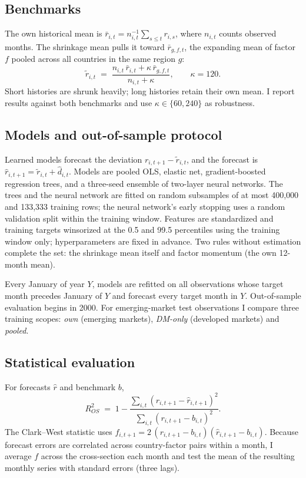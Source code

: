 \documentclass[11pt]{article}
\begin{document}
\subsection{Benchmarks}
The own historical mean is $\bar r_{i,t} = n_{i,t}^{-1}\sum_{s\le t} r_{i,s}$, where $n_{i,t}$ counts observed months. The shrinkage mean pulls it toward $\bar r_{g,f,t}$, the expanding mean of factor $f$ pooled across all countries in the same region $g$:
\begin{equation}
\tilde r_{i,t} \;=\; \frac{n_{i,t}\,\bar r_{i,t} + \kappa\,\bar r_{g,f,t}}{n_{i,t} + \kappa}, \qquad \kappa = 120 .
\label{eq:shrink}
\end{equation}
Short histories are shrunk heavily; long histories retain their own mean. I report results against both benchmarks and use $\kappa \in \{60, 240\}$ as robustness.

\subsection{Models and out-of-sample protocol}
Learned models forecast the deviation $r_{i,t+1} - \tilde r_{i,t}$, and the forecast is $\hat r_{i,t+1} = \tilde r_{i,t} + \hat d_{i,t}$. Models are pooled OLS, elastic net, gradient-boosted regression trees, and a three-seed ensemble of two-layer neural networks. The trees and the neural network are fitted on random subsamples of at most 400,000 and 133,333 training rows; the neural network's early stopping uses a random validation split within the training window. Features are standardized and training targets winsorized at the 0.5 and 99.5 percentiles using the training window only; hyperparameters are fixed in advance. Two rules without estimation complete the set: the shrinkage mean itself and factor momentum (the own 12-month mean).

Every January of year $Y$, models are refitted on all observations whose target month precedes January of $Y$ and forecast every target month in $Y$. Out-of-sample evaluation begins in 2000. For emerging-market test observations I compare three training scopes: \emph{own} (emerging markets), \emph{DM-only} (developed markets) and \emph{pooled}.

\subsection{Statistical evaluation}
For forecasts $\hat r$ and benchmark $b$,
\begin{equation}
R^2_{OS} \;=\; 1 - \frac{\sum_{i,t}\left(r_{i,t+1}-\hat r_{i,t+1}\right)^2}{\sum_{i,t}\left(r_{i,t+1}-b_{i,t}\right)^2}.
\end{equation}
The Clark--West statistic uses $f_{i,t+1} = 2\,(r_{i,t+1}-b_{i,t})(\hat r_{i,t+1}-b_{i,t})$. Because forecast errors are correlated across country-factor pairs within a month, I average $f$ across the cross-section each month and test the mean of the resulting monthly series with \citet{newey1987simple} standard errors (three lags).
\end{document}
